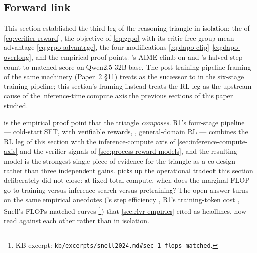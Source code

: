 \subsection{Forward link}
\label{sec:rlvr-forward}

This section established the third leg of the reasoning triangle in
isolation: the  of \cref{eq:verifier-reward}, the
 objective of \cref{eq:grpo} with its critic-free group-mean
advantage \cref{eq:grpo-advantage}, the four  modifications
\cref{eq:dapo-clip}--\cref{eq:dapo-overlong}, and the empirical proof
points: 's AIME climb on  and 's halved step-count to
matched score on Qwen2.5-32B-base. The post-training-pipeline framing
of the same machinery (\hyperref[P2-sec:rlvr-grpo]{Paper~2 §11}) treats  as the successor to
 in the six-stage training pipeline; this section's framing instead
treats the RL leg as the upstream cause of the inference-time compute
axis the previous sections of this paper studied.

 is the empirical proof point that the triangle
\emph{composes}. R1's four-stage pipeline --- cold-start SFT,  with
verifiable rewards, , general-domain RL ---
combines the RL leg of this section with the inference-compute axis
of \cref{sec:inference-compute-axis} and the verifier signals of
\cref{sec:process-reward-models}, and the resulting model is the
strongest single piece of evidence for the triangle as a co-design
rather than three independent gains.  picks up
the operational tradeoff this section deliberately did not close: at
fixed total compute, when does the marginal FLOP go to  training
versus inference search versus pretraining? The open answer turns on
the same empirical anecdotes ('s step efficiency \citep[\S
4]{dapo2025}, R1's training-token cost \citep[\S 2.3]{deepseek-r1},
Snell's FLOPs-matched curves \citep[\S 6]{snell2024}\footnote{KB
excerpt: \nolinkurl{kb/excerpts/snell2024.md#sec-1-flops-matched}.}) that
\cref{sec:rlvr-empirics} cited as headlines, now read against each
other rather than in isolation.
